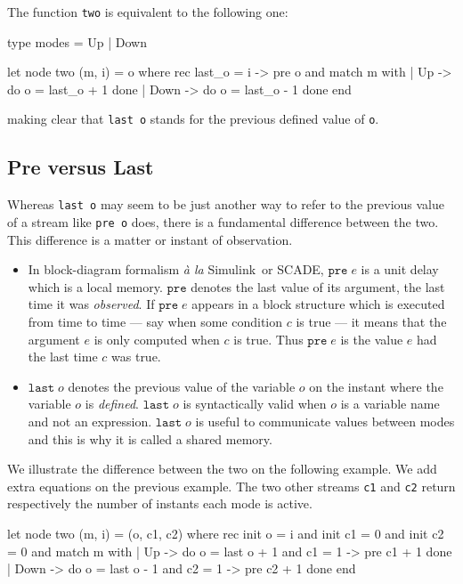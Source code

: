 \documentclass[11pt,titlepage,twoside]{report}
\newcommand{\simulink}{{\sf Simulink}}
\newcommand{\scade}{{\sf SCADE}}
\begin{document}
\medskip\noindent
The function \texttt{two} is equivalent to the following one:
\begin{chklisting}[hide,label=updownmodes]
type modes = Up | Down
\end{chklisting}
\begin{chklisting}[continue]
let node two (m, i) = o where
  rec last_o = i -> pre o
  and match m with
      | Up -> do o = last_o + 1 done
      | Down -> do o = last_o - 1 done
      end
\end{chklisting}
making clear that \verb-last o- stands for the previous defined value
of \verb-o-.

\subsection{Pre versus Last\label{prelast}} %

Whereas \verb-last o- may seem
to be just another way to refer to the previous value of a stream like
\verb-pre o- does, there is a fundamental difference between the
two. This difference is a matter or instant of observation.

\begin{itemize}
\item
In block-diagram formalism {\em \`a la}
\simulink\ or \scade, $\texttt{pre}\;e$ is a unit delay which
is a local memory. $\texttt{pre}$ denotes the last value of its argument, the
last time it was {\em observed}. If $\texttt{pre}\;e$ appears in a
block structure which is executed from time to time --- say when some condition
$c$ is true --- it means that the argument $e$ is only computed when
$c$ is true. Thus $\texttt{pre}\;e$ is the value $e$ had the last time $c$ was true.
\item
$\texttt{last}\;o$ denotes the previous value of the variable $o$ on
  the instant where the variable $o$ is {\em defined}.
  $\texttt{last}\;o$ is syntactically valid when $o$ is a variable name and
  not an expression.  $\texttt{last}\;o$ is useful to communicate
  values between modes and this is why it is called a shared memory.
\end{itemize}

We illustrate the difference between the two on the following
example. We add extra equations on the previous example. The two other streams
\verb-c1- and \verb-c2-
return respectively the number of instants each mode is active.
\begin{chklisting}[include=updownmodes]
let node two (m, i) = (o, c1, c2) where
  rec init o = i
  and init c1 = 0
  and init c2 = 0
  and match m with
       | Up -> do o = last o + 1
              and c1 = 1 -> pre c1 + 1
              done
       | Down -> do o = last o - 1
                 and c2 = 1 -> pre c2 + 1
                 done
    end
\end{chklisting}
\end{document}
